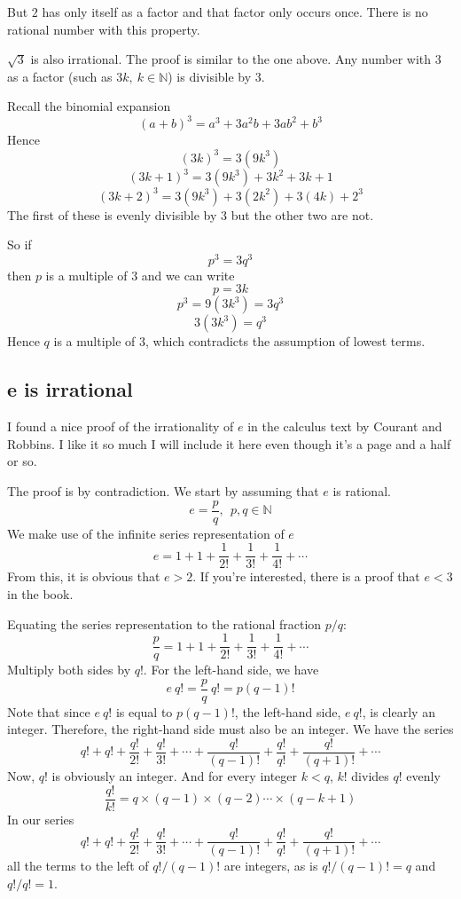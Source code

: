 \documentclass[11pt, oneside]{article}   	%
\begin{document}
But $2$ has only itself as a factor and that factor only occurs once.  There is no rational number with this property.

$\sqrt{3}$ is also irrational.  The proof is similar to the one above.  Any number with $3$ as a factor (such as $3k, \ k \in \mathbb{N}$) is divisible by $3$.

Recall the binomial expansion 
\[ (a+b)^3 = a^3 + 3a^2b + 3ab^2 + b^3 \]
Hence
\[ (3k)^3 = 3(9k^3) \]
\[ (3k+1)^3 = 3(9k^3) + 3k^2 + 3k + 1\]
\[ (3k+2)^3 = 3(9k^3) + 3(2k^2)+ 3(4k) +  2^3 \]
The first of these is evenly divisible by $3$ but the other two are not.

So if 
\[ p^3 = 3 q^3 \]
then $p$ is a multiple of $3$ and we can write
\[ p = 3k \]
\[ p^3 = 9(3k^3) = 3 q^3 \]
\[ 3(3k^3) = q^3 \]
Hence $q$ is a multiple of $3$, which contradicts the assumption of lowest terms.

\subsection*{e is irrational}

I found a nice proof of the irrationality of $e$ in the calculus text by Courant and Robbins.  I like it so much I will include it here even though it's a page and a half or so.

The proof is by contradiction.  We start by assuming that $e$ is rational.
\[ e = \frac{p}{q}, \ \  p,q \in \mathbb{N} \]
We make use of the infinite series representation of $e$
\[ e = 1 + 1 + \frac{1}{2!}  + \frac{1}{3!} + \frac{1}{4!} + \cdots \]
From this, it is obvious that $e > 2$.  If you're interested, there is a proof that $e < 3$ in the book.  

Equating the series representation to the rational fraction $p/q$:
\[ \frac{p}{q} = 1 + 1 + \frac{1}{2!}  + \frac{1}{3!} + \frac{1}{4!} + \cdots \]
Multiply both sides by $q!$.  For the left-hand side, we have 
\[ e \ q! = \frac{p}{q} \ q! = p (q-1)! \]
Note that since $e\ q!$ is equal to $p (q-1)!$, the left-hand side, $e\ q!$, is clearly an integer.
Therefore, the right-hand side must also be an integer.  We have the series
\[ q! + q! + \frac{q!}{2!}  + \frac{q!}{3!}  + \cdots + \frac{q!}{(q-1)!} + \frac{q!}{q!} + \frac{q!}{(q+1)!} + \cdots \]
Now, 
$q!$ is obviously an integer. And for every integer $k < q$, $k!$ divides $q!$ evenly 
\[ \frac{q!}{k!} = q \times (q-1) \times (q-2) \cdots \times (q-k+1) \]
In our series
\[ q! + q! + \frac{q!}{2!}  + \frac{q!}{3!}  + \cdots + \frac{q!}{(q-1)!} + \frac{q!}{q!} + \frac{q!}{(q+1)!} + \cdots \]
all the terms to the left of $q!/(q-1)!$ are integers, as is $q!/(q-1)! = q$ and $q!/q! = 1$.  
\vspace{2 mm}
\end{document}
